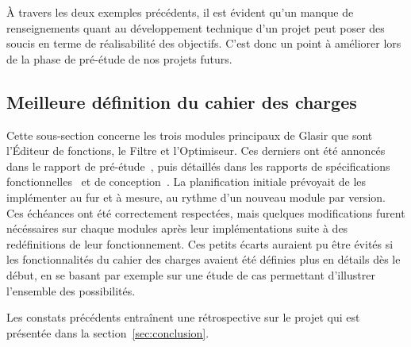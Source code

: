 À travers les deux exemples précédents, il est évident qu'un manque de renseignements quant au développement technique d'un projet peut poser des soucis en terme de réalisabilité des objectifs. C'est donc un point à améliorer lors de la phase de pré-étude de nos projets futurs.

\subsection{Meilleure définition du cahier des charges}
\label{ssec:cahier-charges}

Cette sous-section concerne les trois modules principaux de Glasir que sont l'Éditeur de fonctions, le Filtre et l'Optimiseur. Ces derniers ont été annoncés dans le rapport de pré-étude~\cite{pre_etude}, puis détaillés dans les rapports de spécifications fonctionnelles~\cite{spec_fonc} et de conception~\cite{conception}. La planification initiale prévoyait de les implémenter au fur et à mesure, au rythme d'un nouveau module par version. Ces échéances ont été correctement respectées, mais quelques modifications furent nécéssaires sur chaque modules après leur implémentations suite à des redéfinitions de leur fonctionnement. Ces petits écarts auraient pu être évités si les fonctionnalités du cahier des charges avaient été définies plus en détails dès le début, en se basant par exemple sur une étude de cas permettant d'illustrer l'ensemble des possibilités.

Les constats précédents entraînent une rétrospective sur le projet qui est présentée dans la {\sc section}~\ref{sec:conclusion}.